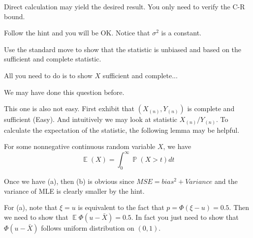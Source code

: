 \documentclass[12pt]{article}
\newenvironment{exercise}[2][Exercise]{\begin{trivlist}
\item[\hskip \labelsep {\bfseries #1}\hskip \labelsep {\bfseries #2.}]}{\end{trivlist}}
\newcommand{\E}{\operatorname{\mathbb{E}}}
\renewcommand{\P}{\operatorname{\mathbb{P}}}
\begin{document}
Direct calculation may yield the desired result. You only need to verify the C-R bound.

\begin{exercise}{2.1}
\end{exercise}

Follow the hint and you will be OK. Notice that $\sigma^2$ is a constant.

\begin{exercise}{2.5}
\end{exercise}

Use the standard move to show that the statistic is unbiased and based on the sufficient and complete statistic.

\begin{exercise}{2.9}
\end{exercise}

All you need to do is to show $X$ sufficient and complete...

\begin{exercise}{2.15}
\end{exercise}

We may have done this question before.

\begin{exercise}{2.25}
\end{exercise}

This one is also not easy. First exhibit that $(X_{(n)}, Y_{(n)})$ is complete and sufficient (Easy). And intuitively we may look at statistic $X_{(n)} / Y_{(n)}$. To calculate the expectation of the statistic, the following lemma may be helpful.

For some nonnegative continuous random variable $X$, we have
$$
\E(X) = \int_0^\infty \P(X > t) dt
$$

\begin{exercise}{2.27}
\end{exercise}

Once we have (a), then (b) is obvious since $MSE = bias^2 + Variance$ and the variance of MLE is clearly smaller  by the hint.

For (a), note that $\xi = u$ is equivalent to the fact that $p = \Phi(\xi - u) = 0.5$. Then we need to show that $\E \Phi (u - \bar{X}) = 0.5$. In fact you just need to show that $\Phi (u - \bar{X})$ follows uniform distribution on $(0,1)$. 

\end{document}
